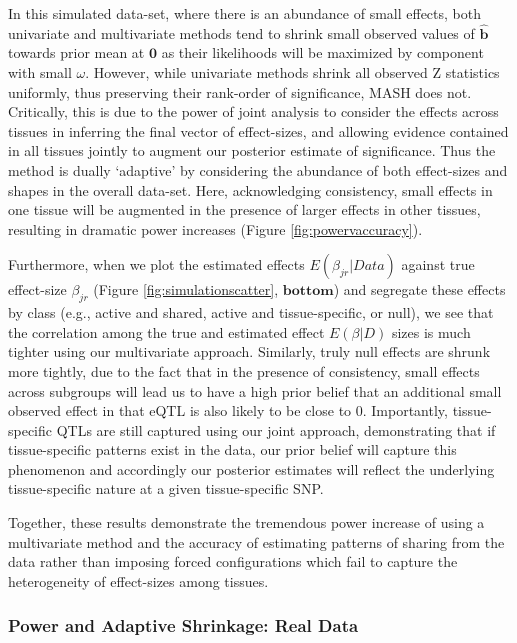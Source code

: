 In this simulated data-set, where there is an abundance of small effects, both univariate and multivariate methods tend to shrink small observed values of $\hat{\bm{b}}$ towards prior mean at $\bm{0}$ as their likelihoods will be maximized by component with small $\omega$. However, while univariate methods shrink all observed Z statistics uniformly, thus preserving their rank-order of significance, MASH does not. Critically, this is due to the power of joint analysis to consider the effects across tissues in inferring the final vector of effect-sizes, and allowing evidence contained in all tissues jointly to augment our posterior estimate of significance. Thus the method is dually `adaptive' by considering the abundance of both effect-sizes and shapes in the overall data-set.  Here, acknowledging consistency, small effects in one tissue will be augmented in the presence of larger effects in other tissues, resulting in dramatic power increases (Figure \ref{fig:powervaccuracy}). 

Furthermore, when we plot the estimated effects $E(\beta_{jr}|Data)$ against true effect-size $\beta_{jr}$ (Figure \ref{fig:simulationscatter}, $\textbf{bottom}$) and segregate these effects by class  (e.g., active and shared, active and tissue-specific, or null), we see that the correlation among the true and estimated effect $E(\beta|D)$ sizes is much tighter using our multivariate approach. Similarly, truly null effects are shrunk more tightly, due to the fact that in the presence of consistency, small effects across subgroups will lead us to have a high prior belief that an additional small observed effect in that eQTL is also likely to be close to 0. Importantly, tissue-specific QTLs are still captured using our joint approach, demonstrating that if tissue-specific patterns exist in the data, our prior belief will capture this phenomenon and accordingly our posterior estimates will reflect the underlying tissue-specific nature at a given tissue-specific SNP.

Together, these results demonstrate the tremendous power increase of using a multivariate method and the accuracy of estimating patterns of sharing from the data rather than imposing forced configurations which fail to capture the heterogeneity of effect-sizes among tissues.


\subsubsection{Power and Adaptive Shrinkage: Real Data}

